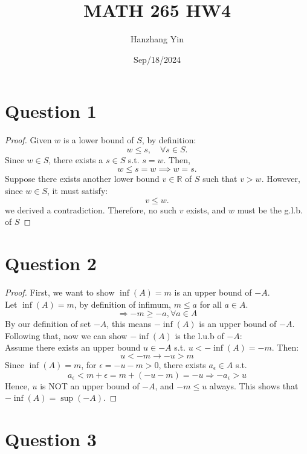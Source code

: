 \documentclass{article}
\title{MATH 265 HW4}
\author{Hanzhang Yin}
\date{Sep/18/2024}
\begin{document}
\maketitle

\section*{Question 1}
\begin{proof}
    Given \( w \) is a lower bound of \( S \), by definition:
    \[ w \leq s, \quad \forall s \in S. \]
    Since \( w \in S \), there exists a \(s \in S\) s.t. \( s = w \). Then,
    \[ w \leq s = w \implies w = s. \]
    Suppose there exists another lower bound \( v \in \mathbb{R} \) of \( S \) such that \( v > w \).
    However, since \( w \in S \), it must satisfy:
    \[ v \leq w. \]
    we derived a contradiction.
    Therefore, no such \( v \) exists, and \( w \) must be the g.l.b. of $S$
\end{proof}

\section*{Question 2}
\begin{proof}
    First, we want to show $\inf(A) = m$ is an upper bound of $-A$.
    \\
    Let $\inf(A) = m$, by definition of infimum, $m \leq a$ for all $a \in A$.
    \[ \Rightarrow -m \geq -a, \forall a \in A \]
    By our definition of set $-A$, this means $-\inf(A)$ is an upper bound of $-A$.
    \\
    Following that, now we can show $-\inf(A)$ is the l.u.b of $-A$:
    \\
    Assume there exists an upper bound $u \in -A$ s.t. $u < -\inf(A) = -m$. Then:
    \[ u < -m \rightarrow -u > m \]
    Since $\inf(A) = m$, for $\epsilon = -u - m > 0$, there exists $a_{\epsilon} \in A$ s.t. 
    \[ a_{\epsilon} < m + \epsilon = m + (-u - m) = -u \Rightarrow -a_{\epsilon} > u \]
    Hence, $u$ is NOT an upper bound of $-A$, and $-m \leq u$ always. This shows that $-\inf(A) = \sup(-A)$.
\end{proof}

\section*{Question 3}
\end{document}
